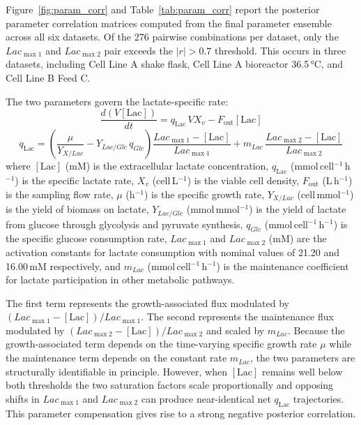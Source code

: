 \label{SI:param_corr}
Figure~\ref{fig:param_corr} and Table~\ref{tab:param_corr} report the posterior parameter correlation matrices computed from the final parameter ensemble across all six datasets. Of the 276 pairwise combinations per dataset, only the $Lac_{\max1}$ and $Lac_{\max2}$ pair exceeds the $|r|>0.7$ threshold. This occurs in three datasets, including Cell Line A shake flask, Cell Line A bioreactor 36.5\,°C, and Cell Line B Feed C.

The two parameters govern the lactate-specific rate:
\begin{equation}
    \frac{d(V[\mathrm{Lac}])}{dt} = q_{\mathrm{Lac}}\,V X_v - F_{\mathrm{out}}[\mathrm{Lac}]
\end{equation}
\begin{equation}
    q_{\mathrm{Lac}} = \left(\frac{\mu}{Y_{X/Lac}} - Y_{Lac/Glc}\,q_{Glc}\right)\frac{Lac_{\max1} - [\mathrm{Lac}]}{Lac_{\max1}} + m_{Lac}\,\frac{Lac_{\max2} - [\mathrm{Lac}]}{Lac_{\max2}}
\end{equation}
\noindent where $[\mathrm{Lac}]$ (mM) is the extracellular lactate concentration, $q_{\mathrm{Lac}}$ (mmol\,cell$^{-1}$\,h$^{-1}$) is the specific lactate rate, $X_v$ (cell\,L$^{-1}$) is the viable cell density, $F_{\mathrm{out}}$ (L\,h$^{-1}$) is the sampling flow rate, $\mu$ (h$^{-1}$) is the specific growth rate, $Y_{X/Lac}$ (cell\,mmol$^{-1}$) is the yield of biomass on lactate, $Y_{Lac/Glc}$ (mmol\,mmol$^{-1}$) is the yield of lactate from glucose through glycolysis and pyruvate synthesis, $q_{Glc}$ (mmol\,cell$^{-1}$\,h$^{-1}$) is the specific glucose consumption rate, $Lac_{\max1}$ and $Lac_{\max2}$ (mM) are the activation constants for lactate consumption with nominal values of 21.20 and 16.00\,mM respectively, and $m_{Lac}$ (mmol\,cell$^{-1}$\,h$^{-1}$) is the maintenance coefficient for lactate participation in other metabolic pathways.

The first term represents the growth-associated flux modulated by $(Lac_{\max1} - [\mathrm{Lac}])/Lac_{\max1}$. The second represents the maintenance flux modulated by $(Lac_{\max2} - [\mathrm{Lac}])/Lac_{\max2}$ and scaled by $m_{Lac}$. Because the growth-associated term depends on the time-varying specific growth rate $\mu$ while the maintenance term depends on the constant rate $m_{Lac}$, the two parameters are structurally identifiable in principle. However, when $[\mathrm{Lac}]$ remains well below both thresholds the two saturation factors scale proportionally and opposing shifts in $Lac_{\max1}$ and $Lac_{\max2}$ can produce near-identical net $q_{\mathrm{Lac}}$ trajectories. This parameter compensation gives rise to a strong negative posterior correlation.

